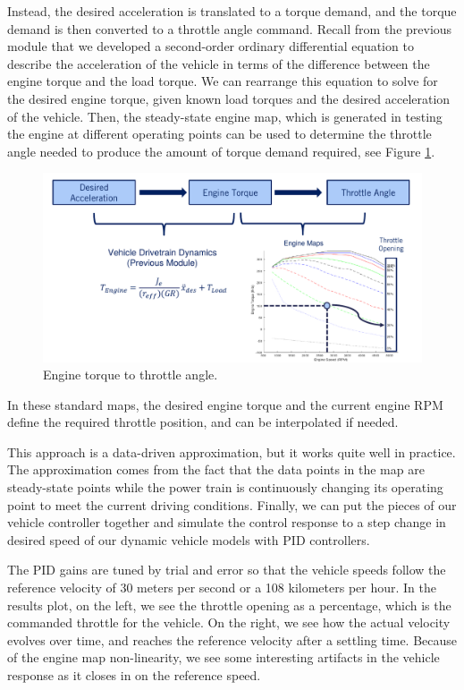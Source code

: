 Instead, the desired acceleration is translated to a torque demand, and the torque demand is then converted to a throttle angle command. Recall from the previous module that we developed a second-order ordinary differential equation to describe the acceleration of the vehicle in terms of the difference between the engine torque and the load torque. 
We can rearrange this equation to solve for the desired engine torque, given known load torques and the desired acceleration of the vehicle. Then, the steady-state engine map, which is generated in testing the engine at different operating points can be used to determine the throttle angle needed to produce the amount of torque demand required, see Figure \ref{engine_torque_to_throttle_angle}. 


\begin{figure}[!htb]
\begin{center}
\includegraphics[scale=0.380]{img/longitudinal_control/engine_torque_to_throttle_angle.jpeg}
\end{center}
\caption{Engine torque to throttle angle.}
\label{engine_torque_to_throttle_angle}
\end{figure}

In these standard maps, the desired engine torque and the current engine RPM define the required throttle position, and can be interpolated if needed. 

This approach is a data-driven approximation, but it works quite well in practice. The approximation comes from the fact that the data points in the map are steady-state points while the power train is continuously changing its operating point to meet the current driving conditions. Finally, we can put the pieces of our vehicle controller together and simulate the control response to a step change in desired speed of our dynamic vehicle models with PID controllers. 

The PID gains are tuned by trial and error so that the vehicle speeds follow the reference velocity of 30 meters per second or a 108 kilometers per hour. In the results plot, on the left, we see the throttle opening as a percentage, which is the commanded throttle for the vehicle. On the right, we see how the actual velocity evolves over time, and reaches the reference velocity after a settling time. Because of the engine map non-linearity, we see some interesting artifacts in the vehicle response as it closes in on the reference speed. 

